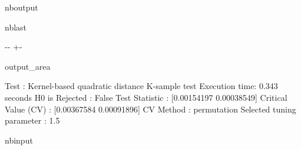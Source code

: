 \documentclass[letterpaper,10pt,english,openany,oneside]{sphinxmanual}
\begin{document}
\begin{sphinxuseclass}{nboutput}
\begin{sphinxuseclass}{nblast}
{

\kern-\sphinxverbatimsmallskipamount\kern-\baselineskip
\kern+\FrameHeightAdjust\kern-\fboxrule
\vspace{\nbsphinxcodecellspacing}

\begin{sphinxuseclass}{output_area}
\begin{sphinxuseclass}{}


\begin{sphinxVerbatim}[commandchars=\\\{\}]
Test : Kernel-based quadratic distance K-sample test
Execution time: 0.343 seconds
H0 is Rejected : False
Test Statistic : [0.00154197 0.00038549]
Critical Value (CV) : [0.00367584 0.00091896]
CV Method : permutation
Selected tuning parameter : 1.5
\end{sphinxVerbatim}



\end{sphinxuseclass}
\end{sphinxuseclass}
}

\end{sphinxuseclass}
\end{sphinxuseclass}
\begin{sphinxuseclass}{nbinput}
{
\begin{sphinxVerbatim}[commandchars=\\\{\}]
\llap{\color{nbsphinxin}[10]:\,\hspace{\fboxrule}\hspace{\fboxsep}}
\end{sphinxVerbatim}
}

\end{sphinxuseclass}
\end{document}
